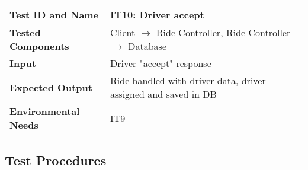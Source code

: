 \vspace{2em}

\noindent\begin{tabular}{l p{}}
    \hline
    \textbf{Test ID and Name} & \textbf{IT10: Driver accept}\\
    \hline
    \textbf{Tested Components} & Client $\rightarrow$ Ride Controller, Ride Controller $\rightarrow$ Database\\
    \hline
    \textbf{Input} & Driver "accept" response\\
    \hline
    \textbf{Expected Output} & Ride handled with driver data, driver assigned and saved in DB\\
    \hline
    \textbf{Environmental Needs} & IT9\\
    \hline
\end{tabular}

\subsection{Test Procedures}

\subsubsection{}